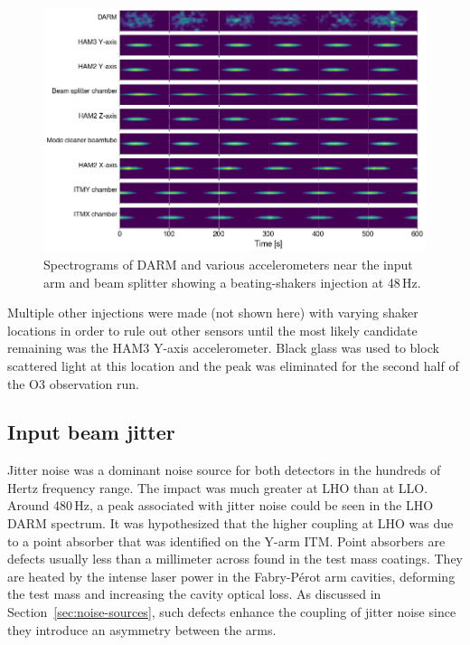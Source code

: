\begin{figure}[htb]
	\centering
	\includegraphics[width=\textwidth]{figures/noise-studies/vib-beat-spectrograms.png}
	\caption{
		Spectrograms of DARM and various accelerometers near the input arm and beam splitter showing a beating-shakers injection at 48\,Hz.}
	\label{fig:vib-beat-spectrograms}
\end{figure}

Multiple other injections were made (not shown here) with varying shaker locations in order to rule out other sensors until the most likely candidate remaining was the HAM3 Y-axis accelerometer.
Black glass was used to block scattered light at this location and the peak was eliminated for the second half of the O3 observation run.


\subsection{Input beam jitter}\label{sec:vib-jitter}

Jitter noise was a dominant noise source for both detectors in the hundreds of Hertz frequency range.
The impact was much greater at LHO than at LLO.
Around 480\,Hz, a peak associated with jitter noise could be seen in the LHO DARM spectrum.
It was hypothesized that the higher coupling at LHO was due to a point absorber that was identified on the Y-arm \ac{ITM}.
Point absorbers are defects usually less than a millimeter across found in the test mass coatings.
They are heated by the intense laser power in the Fabry-P\'erot arm cavities, deforming the test mass and increasing the cavity optical loss.
As discussed in Section~\ref{sec:noise-sources}, such defects enhance the coupling of jitter noise since they introduce an asymmetry between the arms.

